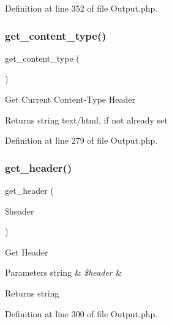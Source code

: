 Definition at line 352 of file Output.\+php.

\mbox{\label{class_c_i___output_a4d8c59d65c47c9146dbc1c7d0c4eccf2}} 
\subsubsection{\texorpdfstring{get\_content\_type()}{get\_content\_type()}}
{\footnotesize\ttfamily get\+\_\+content\+\_\+type (\begin{DoxyParamCaption}{ }\end{DoxyParamCaption})}

Get Current Content-\/\+Type Header

\begin{DoxyReturn}{Returns}
string \textquotesingle{}text/html\textquotesingle{}, if not already set 
\end{DoxyReturn}


Definition at line 279 of file Output.\+php.

\mbox{\label{class_c_i___output_afc84ca7f4f93817160ea738f2f899a74}} 
\subsubsection{\texorpdfstring{get\_header()}{get\_header()}}
{\footnotesize\ttfamily get\+\_\+header (\begin{DoxyParamCaption}\item[{}]{\$header }\end{DoxyParamCaption})}

Get Header


\begin{DoxyParams}[1]{Parameters}
string & {\em \$header} & \\
\hline
\end{DoxyParams}
\begin{DoxyReturn}{Returns}
string 
\end{DoxyReturn}


Definition at line 300 of file Output.\+php.

\mbox{\label{class_c_i___output_aa6c3f8688f804de4f1af8a462fffb922}} 
